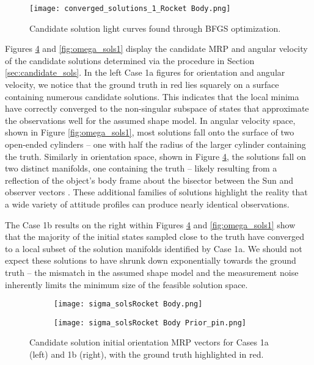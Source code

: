\documentclass[a4paper,twocolumn]{spaceDebrisC} %
\newcommand{\figbig}[0]{0.5\textwidth}
\begin{document}
\begin{figure}[H]
  \centering
  \texttt{[image: converged\_solutions\_1\_Rocket Body.png]}
  \caption{Candidate solution light curves found through BFGS optimization.}
  \label{fig:conv_lcs_synth}
\end{figure}

Figures \ref{fig:sigma_sols1} and \ref{fig:omega_sols1} display the candidate MRP and angular velocity of the candidate solutions determined via the procedure in Section \ref{sec:candidate_sols}. In the left Case 1a figures for orientation and angular velocity, we notice that the ground truth in red lies squarely on a surface containing numerous candidate solutions. This indicates that the local minima have correctly converged to the non-singular subspace of states that approximate the observations well for the assumed shape model. In angular velocity space, shown in Figure \ref{fig:omega_sols1}, most solutions fall onto the surface of two open-ended cylinders -- one with half the radius of the larger cylinder containing the truth. Similarly in orientation space, shown in Figure \ref{fig:sigma_sols1}, the solutions fall on two distinct manifolds, one containing the truth -- likely resulting from a reflection of the object's body frame about the bisector between the Sun and observer vectors \cite{marto2024, burton2024journal}. These additional families of solutions highlight the reality that a wide variety of attitude profiles can produce nearly identical observations.

The Case 1b results on the right within Figures \ref{fig:sigma_sols1} and \ref{fig:omega_sols1} show that the majority of the initial states sampled close to the truth have converged to a local subset of the solution manifolds identified by Case 1a. We should not expect these solutions to have shrunk down exponentially towards the ground truth -- the mismatch in the assumed shape model and the measurement noise inherently limits the minimum size of the feasible solution space.

\begin{figure}[H]
  \centering
  \begin{subfigure}[t]{0.23\textwidth}
    \centering
    \texttt{[image: sigma\_solsRocket Body.png]}
    \caption{}
    \label{fig:sigma_sols1a}
  \end{subfigure}
  \hfill
  \begin{subfigure}[t]{0.23\textwidth}
    \centering
    \texttt{[image: sigma\_solsRocket Body Prior\_pin.png]}
    \caption{}
    \label{fig:sigma_sols1b}
  \end{subfigure}

  \caption{Candidate solution initial orientation MRP vectors for Cases 1a (left) and 1b (right), with the ground truth highlighted in red.}
  \label{fig:sigma_sols1}
\end{figure}
\end{document}
